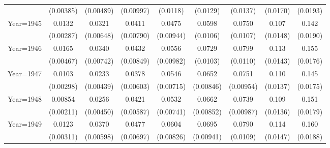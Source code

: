 \begin{table}[htbp]
\begin{tabular}{l*{8}{c}}
                    &   (0.00385)         &   (0.00489)         &   (0.00997)         &    (0.0118)         &    (0.0129)         &    (0.0137)         &    (0.0170)         &    (0.0193)         \\
[1em]
Year=1945           &      0.0132\sym{***}&      0.0321\sym{***}&      0.0411\sym{***}&      0.0475\sym{***}&      0.0598\sym{***}&      0.0750\sym{***}&       0.107\sym{***}&       0.142\sym{***}\\
                    &   (0.00287)         &   (0.00648)         &   (0.00790)         &   (0.00944)         &    (0.0106)         &    (0.0107)         &    (0.0148)         &    (0.0190)         \\
[1em]
Year=1946           &      0.0165\sym{***}&      0.0340\sym{***}&      0.0432\sym{***}&      0.0556\sym{***}&      0.0729\sym{***}&      0.0799\sym{***}&       0.113\sym{***}&       0.155\sym{***}\\
                    &   (0.00467)         &   (0.00742)         &   (0.00849)         &   (0.00982)         &    (0.0103)         &    (0.0110)         &    (0.0143)         &    (0.0176)         \\
[1em]
Year=1947           &      0.0103\sym{***}&      0.0233\sym{***}&      0.0378\sym{***}&      0.0546\sym{***}&      0.0652\sym{***}&      0.0751\sym{***}&       0.110\sym{***}&       0.145\sym{***}\\
                    &   (0.00298)         &   (0.00439)         &   (0.00603)         &   (0.00715)         &   (0.00846)         &   (0.00954)         &    (0.0137)         &    (0.0175)         \\
[1em]
Year=1948           &     0.00854\sym{***}&      0.0256\sym{***}&      0.0421\sym{***}&      0.0532\sym{***}&      0.0662\sym{***}&      0.0739\sym{***}&       0.109\sym{***}&       0.151\sym{***}\\
                    &   (0.00211)         &   (0.00450)         &   (0.00587)         &   (0.00741)         &   (0.00852)         &   (0.00987)         &    (0.0136)         &    (0.0179)         \\
[1em]
Year=1949           &      0.0123\sym{***}&      0.0370\sym{***}&      0.0477\sym{***}&      0.0604\sym{***}&      0.0695\sym{***}&      0.0790\sym{***}&       0.114\sym{***}&       0.160\sym{***}\\
                    &   (0.00311)         &   (0.00598)         &   (0.00697)         &   (0.00826)         &   (0.00941)         &    (0.0109)         &    (0.0147)         &    (0.0188)         \\

\end{tabular}
\end{table}
